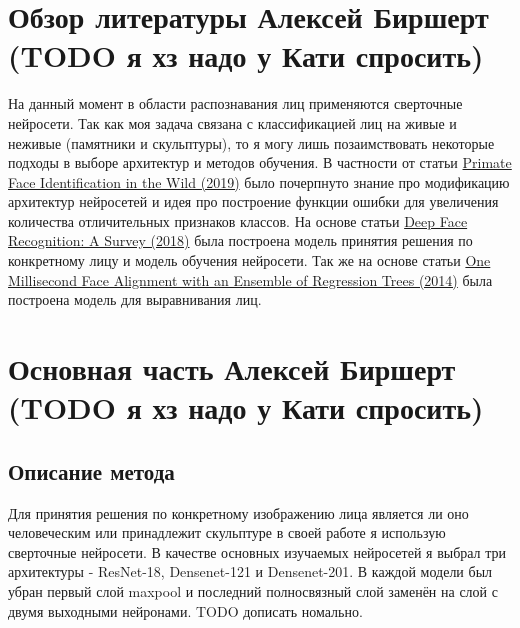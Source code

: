 \documentclass[a4paper,14pt]{extarticle}
\newcommand{\bibref}[3]{\hyperlink{#1}{#2 (#3)}} %
\begin{document}
    \section{Обзор литературы Алексей Биршерт (TODO я хз надо у Кати спросить)}
    На данный момент в области распознавания лиц применяются сверточные нейросети. Так как моя задача связана с классификацией лиц на живые и неживые (памятники и скульптуры), то я могу лишь позаимствовать некоторые подходы в выборе архитектур и методов обучения. В частности от статьи \bibref{pfid}{Primate Face Identification in the Wild}{2019} было почерпнуто знание про модификацию архитектур нейросетей и идея про построение функции ошибки для увеличения количества отличительных признаков классов. На основе статьи \bibref{face}{Deep Face Recognition: A Survey}{2018} была построена модель принятия решения по конкретному лицу и модель обучения нейросети. Так же на основе статьи \bibref{align}{One Millisecond Face Alignment with an Ensemble of Regression Trees}{2014} была построена модель для выравнивания лиц.

    \section{Основная часть Алексей Биршерт (TODO я хз надо у Кати спросить)}

    \subsection{Описание метода}
    Для принятия решения по конкретному изображению лица является ли оно человеческим или принадлежит скульптуре в своей работе я использую сверточные нейросети. В качестве основных изучаемых нейросетей я выбрал три архитектуры - ResNet-18, Densenet-121 и Densenet-201. В каждой модели был убран первый слой maxpool и последний полносвязный слой заменён на слой с двумя выходными нейронами. TODO дописать номально.
\end{document}
